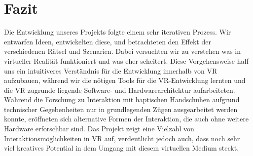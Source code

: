 \newpage
\chapter{Fazit}
Die Entwicklung unseres Projekts folgte einem sehr iterativen Prozess. Wir entwarfen Ideen, entwickelten diese, und betrachteten den Effekt der verschiedenen Rätsel und Szenarien. Dabei versuchten wir zu verstehen was in virtueller Realität funktioniert und was eher scheitert. Diese Vorgehensweise half uns ein intuitiveres Verständnis für die Entwicklung innerhalb von VR aufzubauen, während wir die nötigen Tools für die VR-Entwicklung lernten und die VR zugrunde liegende Software- und Hardwarearchitektur aufarbeiteten.\\ 

\noindent Während die Forschung zu Interaktion mit haptischen Handschuhen aufgrund technischer Gegebenheiten nur in grundlegenden Zügen ausgearbeitet werden konnte, eröffneten sich alternative Formen der Interaktion, die auch ohne weitere Hardware erforschbar sind. Das Projekt zeigt eine Vielzahl von Interaktionsmöglichkeiten in VR auf, verdeutlicht jedoch auch, dass noch sehr viel kreatives Potential in dem Umgang mit diesem virtuellen Medium steckt.
